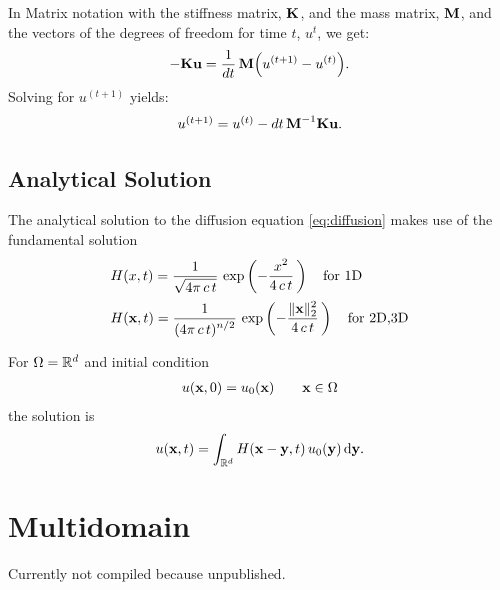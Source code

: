 In Matrix notation with the stiffness matrix, $\textbf{K}$, and the mass matrix, $\textbf{M}$, and the vectors of the degrees of freedom for time $t$, $u^{t}$, we get:
\begin{equation*}
  \begin{array}{lll}
    -\textbf{K}\textbf{u} = \displaystyle\frac{\displaystyle{1}}{\displaystyle{dt}}\, \textbf{M}\Big(u^{(t+1)} - u^{(t)}\Big).
  \end{array}
\end{equation*}
Solving for $u^{(t+1)}$ yields:
\begin{equation*}
  \begin{array}{lll}
    u^{(t+1)} = u^{(t)} - dt \,\textbf{M}^{-1}\textbf{K}\textbf{u}.
  \end{array}
\end{equation*}
\subsection{Analytical Solution}
The analytical solution to the diffusion equation \eqref{eq:diffusion} makes use of the fundamental solution
\begin{equation*}
  \begin{array}{lll}
    H(x,t) = \displaystyle\frac{\displaystyle{1}}{\displaystyle{\sqrt{4\pi\,c\,t}}}\,\exp\left(-\displaystyle\frac{\displaystyle{x^2}}{\displaystyle{4\,c\,t}}\,\right) \quad \text{for 1D}\\[4mm]
    H(\textbf{x},t) = \displaystyle\frac{\displaystyle{1}}{\displaystyle{(4\pi\,c\,t)^{n/2}}}\,\exp\left(-\displaystyle\frac{\displaystyle{\Vert \textbf{x}\Vert_2^2}}{\displaystyle{4\,c\,t}}\,\right) \quad \text{for 2D,3D}\\[4mm]
  \end{array}
\end{equation*}
For $\Omega=\mathbb{R}^d$ and initial condition
\begin{equation*}
  \begin{array}{lll}
    u(\textbf{x},0) = u_0(\textbf{x})\qquad \textbf{x} \in \Omega
  \end{array}
\end{equation*}
the solution is
\begin{equation*}
  \begin{array}{lll}
    u(\bfx,t) = \ds\int_{\R^d} H(\bfx - \bfy,t)\,u_0(\bfy)\,\d \bfy.
  \end{array}
\end{equation*}

\section{Multidomain}

Currently not compiled because unpublished.


